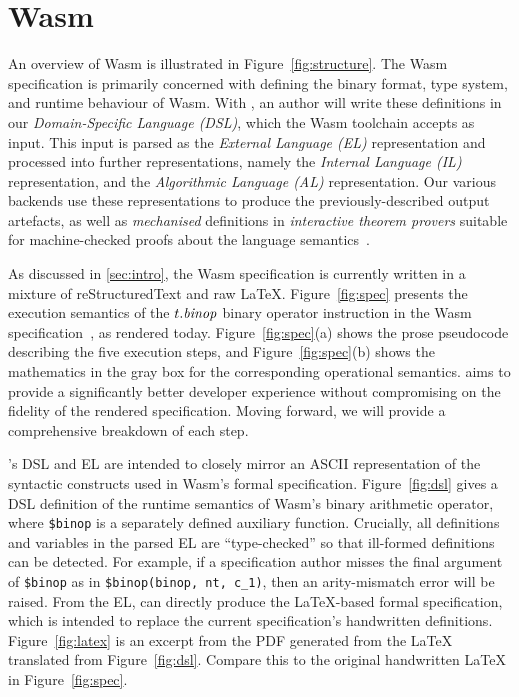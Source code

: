 
\section{Wasm \dslname}
\label{sec:structure}

An overview of Wasm \dslname is illustrated in Figure~\ref{fig:structure}.
%
The Wasm specification is primarily concerned with defining the binary format, type system, and runtime behaviour of Wasm.
%
With \dslname, an author will write these definitions in our \emph{Domain-Specific Language (DSL)}, which the Wasm \dslname toolchain accepts as input.
%
This input is parsed as the \textit{External Language (EL)} representation and processed into further representations,
namely the \textit{Internal Language (IL)} representation,
and the \textit{Algorithmic Language (AL)} representation.
Our various backends use these representations to produce the previously-described output artefacts, as well as \textit{mechanised} definitions in \textit{interactive theorem provers} suitable for machine-checked proofs about the language semantics~\cite{Watt2018MechanisingAV, Watt2021Two}.

As discussed in \cref{sec:intro}, the Wasm specification is currently written in a mixture of
reStructuredText and raw LaTeX.  Figure~\ref{fig:spec} presents the execution
semantics of the $t.\mbox{\emph{binop}}$ binary operator instruction in the Wasm specification~\cite[Section 4.4]{wasm-spec}, as rendered today.
Figure~\ref{fig:spec}(a) shows
the prose pseudocode describing the five execution steps,
and Figure~\ref{fig:spec}(b) shows the mathematics in the gray box for the corresponding
operational semantics.
%
\dslname aims to provide a significantly better developer experience without compromising on the fidelity of the rendered specification.
Moving forward, we will provide a
comprehensive breakdown of each step.

\dslname's DSL and EL are intended to closely mirror an ASCII representation of the syntactic constructs used in Wasm's formal specification.
Figure~\ref{fig:dsl} gives a DSL definition of the runtime semantics of Wasm's binary arithmetic operator,
where {\small\verb!$binop! }is a separately defined auxiliary function.
%
Crucially, all definitions and variables in the parsed EL are ``type-checked'' so that ill-formed definitions can be detected.
For example, if a specification author misses the final argument of 
{\small\verb!$binop!} as in {\small\verb!$binop(binop, nt, c_1)!},
then an arity-mismatch error will be raised.
%
From the EL, \dslname can directly produce the LaTeX-based formal specification, which is intended to replace the current specification's handwritten definitions.
Figure~\ref{fig:latex} is an excerpt from the PDF generated from the LaTeX
translated from Figure~\ref{fig:dsl}.  Compare this to the original handwritten LaTeX in Figure~\ref{fig:spec}.


